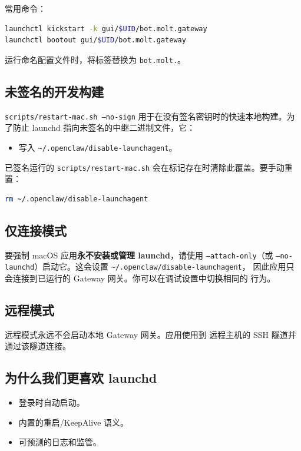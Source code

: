 常用命令：

\begin{lstlisting}[language=bash]
launchctl kickstart -k gui/$UID/bot.molt.gateway
launchctl bootout gui/$UID/bot.molt.gateway
\end{lstlisting}


运行命名配置文件时，将标签替换为 \texttt{bot.molt.}。

\subsection{未签名的开发构建}


\texttt{scripts/restart-mac.sh --no-sign} 用于在没有签名密钥时的快速本地构建。为了防止 launchd 指向未签名的中继二进制文件，它：

\begin{itemize}
  \item 写入 \texttt{\textasciitilde{}/.openclaw/disable-launchagent}。
\end{itemize}


已签名运行的 \texttt{scripts/restart-mac.sh} 会在标记存在时清除此覆盖。要手动重置：

\begin{lstlisting}[language=bash]
rm ~/.openclaw/disable-launchagent
\end{lstlisting}


\subsection{仅连接模式}


要强制 macOS 应用\textbf{永不安装或管理 launchd}，请使用
\texttt{--attach-only}（或 \texttt{--no-launchd}）启动它。这会设置 \texttt{\textasciitilde{}/.openclaw/disable-launchagent}，
因此应用只会连接到已运行的 Gateway 网关。你可以在调试设置中切换相同的
行为。

\subsection{远程模式}


远程模式永远不会启动本地 Gateway 网关。应用使用到
远程主机的 SSH 隧道并通过该隧道连接。

\subsection{为什么我们更喜欢 launchd}


\begin{itemize}
  \item 登录时自动启动。
  \item 内置的重启/KeepAlive 语义。
  \item 可预测的日志和监管。
\end{itemize}



